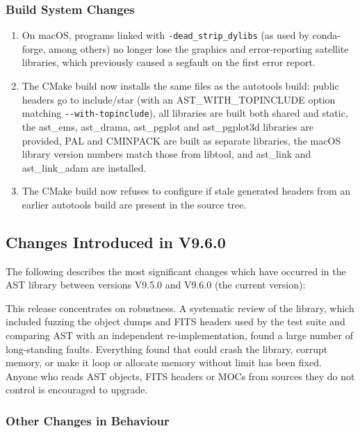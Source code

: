 \documentclass[twoside,11pt]{starlink}
\begin{document}
\subsubsection{Build System Changes}

\begin{enumerate}
\item On macOS, programs linked with \texttt{-dead\_strip\_dylibs} (as used by conda-forge, among others) no longer lose the graphics and error-reporting satellite libraries, which previously caused a segfault on the first error report.
\item The CMake build now installs the same files as the autotools build: public headers go to include/star (with an AST\_WITH\_TOPINCLUDE option matching \texttt{-{}-with-topinclude}), all libraries are built both shared and static, the ast\_ems, ast\_drama, ast\_pgplot and ast\_pgplot3d libraries are provided, PAL and CMINPACK are built as separate libraries, the macOS library version numbers match those from libtool, and ast\_link and ast\_link\_adam are installed.
\item The CMake build now refuses to configure if stale generated headers from an earlier autotools build are present in the source tree.
\end{enumerate}

\subsection{Changes Introduced in V9.6.0}
The following describes the most significant changes which have
occurred in the AST library between versions V9.5.0 and V9.6.0 (the
current version):

This release concentrates on robustness.
A systematic review of the library, which included fuzzing the object dumps and FITS headers used by the test suite and comparing AST with an independent re-implementation, found a large number of long-standing faults.
Everything found that could crash the library, corrupt memory, or make it loop or allocate memory without limit has been fixed.
Anyone who reads AST objects, FITS headers or MOCs from sources they do not control is encouraged to upgrade.

\subsubsection{Other Changes in Behaviour}
\end{document}
